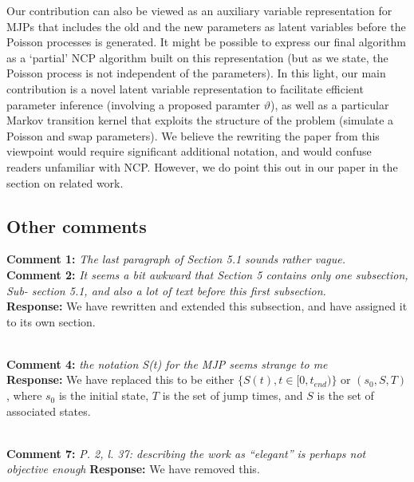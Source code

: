 \documentclass[11pt]{article}
\newcommand{\rev}[2]{\textbf{Comment #1: }\emph{#2}}
\newcommand{\resp}{\textbf{Response: }}
\begin{document}
Our contribution can also be viewed as an auxiliary variable representation for MJPs that includes the old and the new parameters as latent variables before the Poisson processes is generated. 
It might be possible to express our final algorithm as a `partial' NCP algorithm built on this representation (but as we state, the Poisson process is not independent of the parameters). 
In this light, our main contribution is a novel latent variable representation to facilitate efficient parameter inference (involving a proposed paramter $\vartheta$), as well as a particular Markov transition kernel that exploits the structure of the problem (simulate a Poisson and swap parameters). We believe the rewriting the paper from this viewpoint would require significant additional notation, and would confuse readers unfamiliar with NCP. However, we do point this out in our paper in the section on related work.


\subsection*{Other comments}
\rev{1}{The last paragraph of Section 5.1 sounds rather vague.} \\ 
\rev{2}{It seems a bit awkward that Section 5 contains only one subsection, Sub- section 5.1, and also a lot of text before this first subsection.}\\ 
\resp We have rewritten and extended this subsection, and have assigned it to its own section.

~\\ 
\rev{4}{the notation S(t) for the MJP seems strange to me} \\
\resp We have replaced this to be either $\{S(t), t \in [0,t_{end})\}$ or $(s_0, S, T)$, where $s_0$ is the initial state, $T$ is the set of jump times, and $S$ is the set of associated states.

~\\
\rev{7}{P. 2, l. 37: describing the work as “elegant” is perhaps not objective enough}
\resp{We have removed this.}
\end{document}
